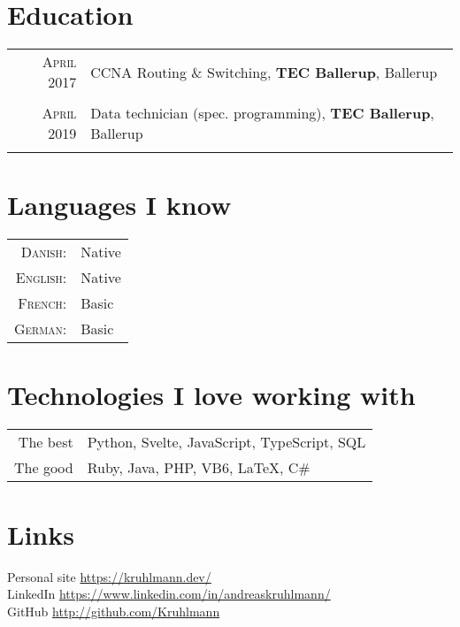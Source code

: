\documentclass[a4paper,10pt]{article}
\begin{document}
\section{Education}
\begin{tabular}{rl}	
 \textsc{April} 2017 & CCNA Routing \& Switching, \textbf{TEC Ballerup}, Ballerup\\ & \\
 \textsc{April} 2019 & Data technician (spec. programming), \textbf{TEC Ballerup}, Ballerup\\ & \\
\end{tabular}


\section{Languages I know}
\begin{tabular}{rl}
 \textsc{Danish:}&Native\\
\textsc{English:}&Native\\
\textsc{French:}&Basic\\
\textsc{German:}&Basic\\
\end{tabular}

\section{Technologies I love working with}
\begin{tabular}{rl}
 The best & Python, Svelte, JavaScript, TypeScript, SQL\\
 The good & Ruby, Java, PHP, VB6, \LaTeX, C\#
\end{tabular}

\section{Links}
Personal site \href{https://kruhlmann.dev/}{https://kruhlmann.dev/}\\
LinkedIn \href{https://www.linkedin.com/in/andreaskruhlmann/}{https://www.linkedin.com/in/andreaskruhlmann/}\\
GitHub  \href{https://github.com/Kruhlmann}{http://github.com/Kruhlmann}
\end{document}
